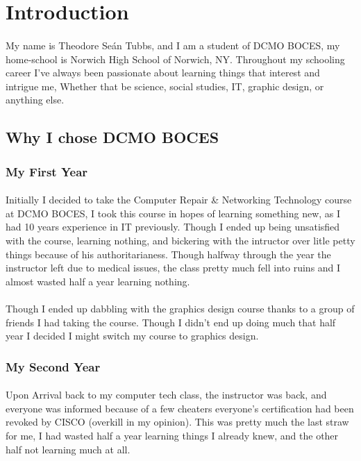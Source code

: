 \section{Introduction}
\paragraph{}
My name is Theodore Se\'{a}n Tubbs, and I am a student of DCMO BOCES, my
home-school is Norwich High School of Norwich, NY. Throughout my schooling
career I've always been passionate about learning things that interest and
intrigue me, Whether that be science, social studies, IT, graphic design, or
anything else.

\subsection{Why I chose DCMO BOCES}

\subsubsection{My First Year}
\paragraph{}
Initially I decided to take the Computer Repair \& Networking Technology course
at DCMO BOCES, I took this course in hopes of learning something new, as I had
10 years experience in IT previously. Though I ended up being unsatisfied with
the course, learning nothing, and bickering with the intructor over litle petty
things because of his authoritarianess. Though halfway through the year the
instructor left due to medical issues, the class pretty much fell into ruins
and I almost wasted half a year learning nothing.

\paragraph{}
Though I ended up dabbling with the graphics design course thanks to a group of
friends I had taking the course. Though I didn't end up doing much that half
year I decided I might switch my course to graphics design.

\subsubsection{My Second Year}
\paragraph{}
Upon Arrival back to my computer tech class, the instructor was back, and
everyone was informed because of a few cheaters everyone's certification had
been revoked by CISCO (overkill in my opinion). This was pretty much the last
straw for me, I had wasted half a year learning things I already knew, and the
other half not learning much at all.

